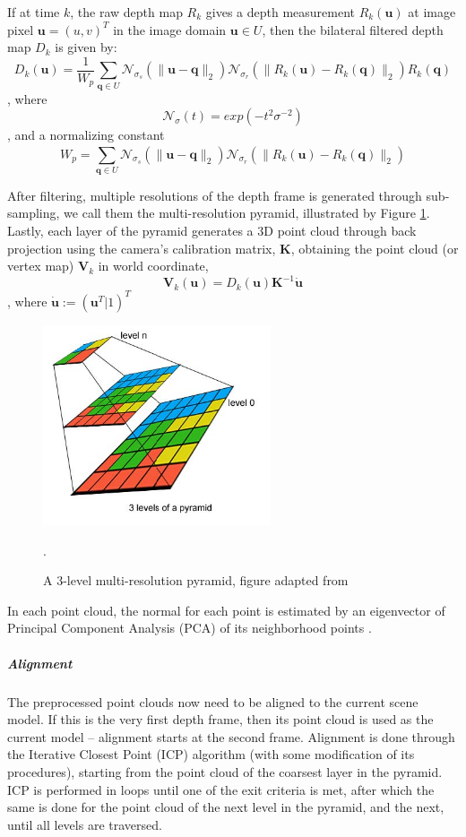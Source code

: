 If at time \(k\), the raw depth map \( R_k \) gives a depth measurement \( R_k(\textbf{u}) \) at image pixel \( \textbf{u} = (u,v)^T \) in the image domain \( \textbf{u} \in U \), then the bilateral filtered depth map \( D_k \) is given by:
\[  D_k(\textbf{u}) = \frac{1}{W_p} \sum_{\textbf{q} \in U}^{} \mathcal{N}_{\sigma_s}(\| \textbf{u} - \textbf{q} \|_2)  \mathcal{N}_{\sigma_r}(\| R_k(\textbf{u}) - R_k(\textbf{q}) \|_2) R_k(\textbf{q})  \]
, where 
\[ \mathcal{N}_{\sigma}(t) = exp(-t^2 \sigma^{-2}) \]
, and a normalizing constant 
\[  W_p = \sum_{\textbf{q} \in U}^{} \mathcal{N}_{\sigma_s}(\| \textbf{u} - \textbf{q} \|_2)  \mathcal{N}_{\sigma_r}(\| R_k(\textbf{u}) - R_k(\textbf{q}) \|_2)  \] 

After filtering, multiple resolutions of the depth frame is generated through sub-sampling, we call them the multi-resolution pyramid, illustrated by Figure \ref{fig:resolutionPyramid}.  Lastly, each layer of the pyramid generates a 3D point cloud through back projection using the camera's calibration matrix, \(\textbf{K}\), obtaining the point cloud (or vertex map) \(\textbf{V}_k\) in world coordinate,
\[  \textbf{V}_k(\textbf{u}) = D_k(\textbf{u}) \textbf{K}^{-1} \dot{\textbf{u}} \]
, where \( \dot{\textbf{u}} := (\textbf{u}^T|1)^T \)
\begin{figure} [h]
	\centering
	\includegraphics[width=0.6\textwidth]{./img/resolution_pyramid.jpg}
	\caption{A 3-level multi-resolution pyramid, figure adapted from \cite{pirovano2011kinfu}}.
	\label{fig:resolutionPyramid}
\end{figure}

In each point cloud, the normal for each point is estimated by an eigenvector of Principal Component Analysis (PCA) of its neighborhood points \cite{pirovano2011kinfu}.


\subparagraph{Alignment}
The preprocessed point clouds now need to be aligned to the current scene model.  If this is the very first depth frame, then its point cloud is used as the current model -- alignment starts at the second frame.  Alignment is done through the Iterative Closest Point (ICP) algorithm (with some modification of its procedures), starting from the point cloud of the coarsest layer in the pyramid.  ICP is performed in loops until one of the exit criteria is met, after which the same is done for the point cloud of the next level in the pyramid, and the next, until all levels are traversed.

